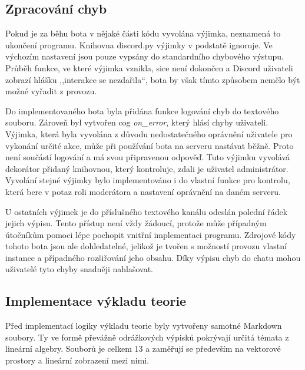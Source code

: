 \documentclass[FM]{tulthesis}
\begin{document}
	
	\subsection{Zpracování chyb}
	
	Pokud je za běhu bota v nějaké části kódu vyvolána výjimka, neznamená to ukončení programu. Knihovna discord.py výjimky v podstatě ignoruje. Ve výchozím nastavení jsou pouze vypsány do standardního chybového výstupu. Průběh funkce, ve které výjimka vznikla, sice není dokončen a Discord uživateli zobrazí hlášku ,,interakce se nezdařila``, bota by však tímto způsobem nemělo být možné vyřadit z provozu.
	
	Do implementovaného bota byla přidána funkce logování chyb do textového souboru. Zároveň byl vytvořen cog \textit{on\_error}, který hlásí chyby uživateli. Výjimka, která byla vyvolána z důvodu nedostatečného oprávnění uživatele pro vykonání určité akce, může při používání bota na serveru nastávat běžně. Proto není součástí logování a má svou připravenou odpověď. Tuto výjimku vyvolává dekorátor přidaný knihovnou, který kontroluje, zdali je uživatel administrátor. Vyvolání stejné výjimky bylo implementováno i do vlastní funkce pro kontrolu, která bere v potaz roli moderátora a nastavení oprávnění na daném serveru.
	
	U ostatních výjimek je do příslušného textového kanálu odeslán polední řádek jejich výpisu. Tento přístup není vždy žádoucí, protože může případným útočníkům pomoci lépe pochopit vnitřní implementaci programu. Zdrojové kódy tohoto bota jsou ale dohledatelné, jelikož je tvořen s možností provozu vlastní instance a případného rozšiřování jeho obsahu. Díky výpisu chyb do chatu mohou uživatelé tyto chyby snadněji nahlašovat.
	
	
	\subsection{Implementace výkladu teorie}

	Před implementací logiky výkladu teorie byly vytvořeny samotné Markdown soubory. Ty ve formě převážně odrážkových výpisků pokrývají určitá témata z lineární algebry. Souborů je celkem 13 a zaměřují se především na vektorové prostory a lineární zobrazení mezi nimi.
\end{document}
